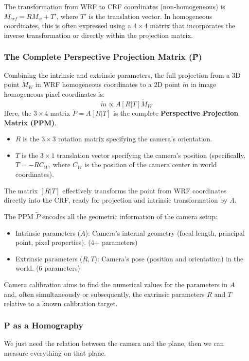 The transformation from WRF to CRF coordinates (non-homogeneous) is $M_{crf} = R M_w + T'$, where $T'$ is the translation vector. In homogeneous coordinates, this is often expressed using a $4\times4$ matrix that incorporates the inverse transformation or directly within the projection matrix.

\subsubsection{The Complete Perspective Projection Matrix (\~{P})}

Combining the intrinsic and extrinsic parameters, the full projection from a 3D point $\tilde{M}_W$ in WRF homogeneous coordinates to a 2D point $\tilde{m}$ in image homogeneous pixel coordinates is:
\[
\tilde{m} \propto A [R | T] \tilde{M}_W
\]
Here, the $3 \times 4$ matrix $\tilde{P} = A[R|T]$ is the complete \textbf{Perspective Projection Matrix (PPM)}.
\begin{itemize}
    \item $R$ is the $3 \times 3$ rotation matrix specifying the camera's orientation.
    \item $T$ is the $3 \times 1$ translation vector specifying the camera's position (specifically, $T = -RC_W$, where $C_W$ is the position of the camera center in world coordinates).
\end{itemize}
The matrix $[R|T]$ effectively transforms the point from WRF coordinates directly into the CRF, ready for projection and intrinsic transformation by $A$.

The PPM $\tilde{P}$ encodes all the geometric information of the camera setup:
\begin{itemize}
    \item Intrinsic parameters ($A$): Camera's internal geometry (focal length, principal point, pixel properties). (4+ parameters)
    \item Extrinsic parameters ($R, T$): Camera's pose (position and orientation) in the world. (6 parameters)
\end{itemize}
Camera calibration aims to find the numerical values for the parameters in $A$ and, often simultaneously or subsequently, the extrinsic parameters $R$ and $T$ relative to a known calibration target.


\subsubsection{P as a Homography}
We just need the relation between the camera and the plane, then we can measure everything on that plane.

